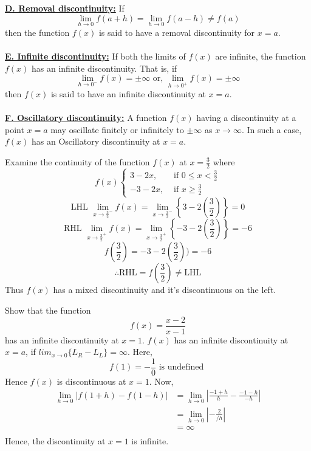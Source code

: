 \underline{\textbf{D. Removal discontinuity:}}
If \[
    \lim_{h \to 0} f(a+h) = \lim_{h \to 0} f(a-h) \neq f(a)
\] then the function $f(x)$ is said to have a removal discontinuity for $x=a$. \\~\\

\underline{\textbf{E. Infinite discontinuity:}}
If both the limits of $f(x)$ are infinite, the function $f(x)$ has an infinite discontinuity. That is, if \[
    \lim_{h \to 0^-} f(x) = \pm \infty \text{ or, } \lim_{h \to 0^+} f(x) = \pm \infty
\] then $f(x)$ is said to have an infinite discontinuity at $x=a$. \\~\\

\underline{\textbf{F. Oscillatory discontinuity:}}
A function $f(x)$ having a discontinuity at a point $x=a$ may oscillate finitely or infinitely to $\pm \infty$ as $x \to \infty$. In such a case, $f(x)$ has an Oscillatory discontinuity at $x=a$.

\begin{example}{Examine the continuity of the function $f(x)$ at $x=\frac{3}{2}$ where 
    \begin{equation*}
        f(x)
        \begin{cases}
            3-2x, &\text{ if } 0 \le x < \frac{3}{2} \\
            -3-2x, & \text{ if } x \ge \frac{3}{2}
        \end{cases}
    \end{equation*}
    }{}
    \[ \text{LHL } \lim_{x \to \frac{3}{2}^-} f(x) = \lim_{x \to \frac{3}{2}^-} \left\{ 3-2 \left( \frac{3}{2} \right) \right\} = 0 \]
    \[ \text{RHL } \lim_{x \to \frac{3}{2}^+} f(x) = \lim_{x \to \frac{3}{2}^+} \left\{ -3-2 \left( \frac{3}{2} \right) \right\} = -6 \]
    \[ f \left( \frac{3}{2} \right) = -3-2 \left( \frac{3}{2} \right)) = -6 \]
    \[ \therefore \text{RHL} = f\left(\frac{3}{2}\right) \neq \text{LHL} \]
    Thus $f(x)$ has a mixed discontinuity and it's discontinuous on the left.
\end{example}

\begin{example}{Show that the function \[
    f(x) = \frac{x-2}{x-1}
\] has an infinite discontinuity at $x=1$.}{}
    $f(x)$ has an infinite discontinuity at $x=a$, if \(lim_{x \to 0} \{ L_R - L_L \} = \infty\). Here,
    \[ f(1) = -\frac{1}{0} \text{ is undefined } \] Hence $f(x)$ is discontinuous at $x=1$. Now,
    \begin{align*}
        \lim_{h \to 0} \left| f(1+h) - f(1-h) \right| &= \lim_{h \to 0} \left| \frac{-1+h}{h} - \frac{-1-h}{-h} \right| \\
        &= \lim_{h \to 0} \left| -\frac{2}{/h} \right| \\
        &= \infty \\
    \end{align*}
    Hence, the discontinuity at $x=1$ is infinite.
\end{example}

